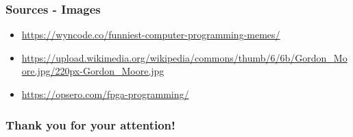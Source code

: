 \documentclass{beamer}
\begin{document}
\begin{frame}
\frametitle{Sources - Images}
\begin{itemize}
	\item \url{https://wyncode.co/funniest-computer-programming-memes/}
	\item \url{https://upload.wikimedia.org/wikipedia/commons/thumb/6/6b/Gordon_Moore.jpg/220px-Gordon_Moore.jpg}
	\item \url{https://opsero.com/fpga-programming/}
\end{itemize}
\end{frame}
\begin{frame}
    \frametitle{Thank you for your attention!}
\end{frame}
\end{document}
